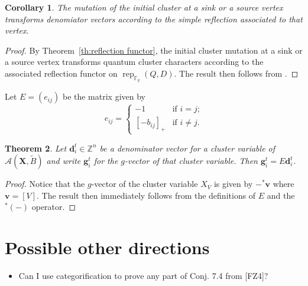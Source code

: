 \documentclass{amsart}
\newtheorem{theorem}{Theorem}
\newtheorem{corollary}[theorem]{Corollary}
\newcommand{\bfd}{\mathbf{d}}
\newcommand{\bfg}{\mathbf{g}}
\newcommand{\bfv}{\mathbf{v}}
\newcommand{\bfX}{\mathbf{X}}
\newcommand{\cA}{\mathcal{A}}
\newcommand{\FF}{\mathbb{F}}
\newcommand{\rep}{\operatorname{rep}}
\newcommand{\ZZ}{\mathbb{Z}}
\begin{document}
 \begin{corollary}
  The mutation of the initial cluster at a sink or a source vertex transforms denomiator vectors according to the simple reflection associated to that vertex.
 \end{corollary}
 \begin{proof}
  By Theorem~\ref{th:reflection functor}, the initial cluster mutation at a sink or a source vertex transforms quantum cluster characters according to the associated reflection functor on $\rep_{\FF_q}(Q,D)$.  The result then follows from \cite[Prop. 2.1]{dlab-ringel}.
 \end{proof}

 Let $E=(e_{ij})$ be the matrix given by
 \[e_{ij}=\begin{cases} -1 & \text{if $i=j$;}\\ [-b_{ij}]_+ & \text{if $i\ne j$.}\end{cases}\]
 \begin{theorem}
  Let $\bfd_i^t\in\ZZ^n$ be a denominator vector for a cluster variable of $\cA(\bfX,\tilde B)$ and write $\bfg_i^t$ for the $g$-vector of that cluster variable.  Then $\bfg_i^t=E\bfd_i^t$.
 \end{theorem}
 \begin{proof}
  Notice that the $g$-vector of the cluster variable $X_V$ is given by $-{}^*\bfv$ where $\bfv=[V]$.  The result then immediately follows from the definitions of $E$ and the ${}^*(-)$ operator.
 \end{proof}

 \section{Possible other directions}
 \begin{itemize}
   \item Can I use categorification to prove any part of Conj. 7.4 from [FZ4]?
 \end{itemize}
\end{document}
